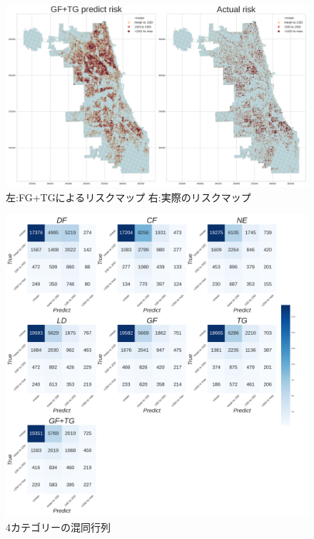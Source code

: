 \begin{figure}
  \centering %
  \includegraphics[scale=0.25]{./non-crime-no-timeseries-fig/GF+TG_riskmap.png}
  \caption{左:FG+TGによるリスクマップ 右:実際のリスクマップ}
  \label{fig:non-crime-no-timeseries-gf-tg-risk}
\end{figure}
\begin{figure}
  \centering %
  \includegraphics[scale=0.16]{./non-crime-no-timeseries-fig/non_crime_no_timeseries_four_cm.png}
  \caption{4カテゴリーの混同行列}
  \label{fig:non-crime-no-timeseries-4cm}
\end{figure}

